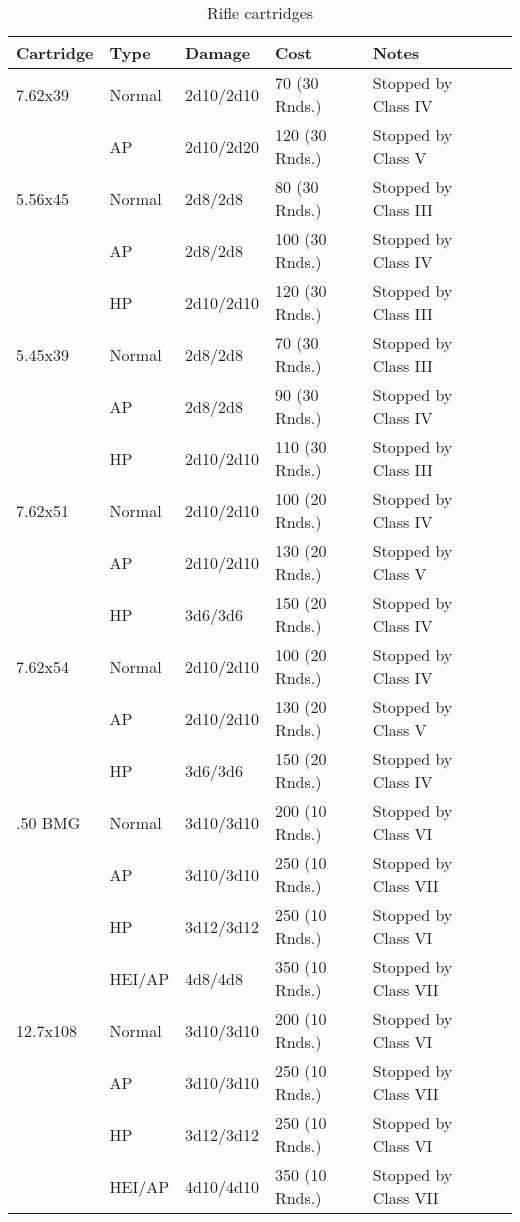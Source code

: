 \begin{table}
  \caption{Rifle cartridges}
  \begin{center}
    \begin{tabular}{| l | l | l | l | l | l |}
      \hline
      \textbf{Cartridge}  & \textbf{Type} & \textbf{Damage} &
      \textbf{Cost}  & \textbf{Notes} \\ \hline

      7.62x39  & Normal  & 2d10/2d10  & 70 (30 Rnds.)  & Stopped by Class IV \\ \hline
      \,       & AP      & 2d10/2d20  & 120 (30 Rnds.) & Stopped by Class V \\ \hline
      5.56x45  & Normal  & 2d8/2d8    & 80 (30 Rnds.)  & Stopped by Class III \\ \hline
      \,       & AP      & 2d8/2d8    & 100 (30 Rnds.) & Stopped by Class IV \\ \hline
      \,       & HP      & 2d10/2d10  & 120 (30 Rnds.) & Stopped by Class III \\ \hline
      5.45x39  & Normal  & 2d8/2d8    & 70 (30 Rnds.)  & Stopped by Class III \\ \hline
      \,       & AP      & 2d8/2d8    & 90 (30 Rnds.)  & Stopped by Class IV \\ \hline
      \,       & HP      & 2d10/2d10  & 110 (30 Rnds.) & Stopped by Class III \\ \hline
      7.62x51  & Normal  & 2d10/2d10  & 100 (20 Rnds.) & Stopped by Class IV \\ \hline
      \,       & AP      & 2d10/2d10  & 130 (20 Rnds.) & Stopped by Class V \\ \hline
      \,       & HP      & 3d6/3d6    & 150 (20 Rnds.) & Stopped by Class IV \\ \hline
      7.62x54  & Normal  & 2d10/2d10  & 100 (20 Rnds.) & Stopped by Class IV \\ \hline
      \,       & AP      & 2d10/2d10  & 130 (20 Rnds.) & Stopped by Class V \\ \hline
      \,       & HP      & 3d6/3d6    & 150 (20 Rnds.) & Stopped by Class IV \\ \hline
      .50 BMG  & Normal  & 3d10/3d10  & 200 (10 Rnds.) & Stopped by Class VI \\ \hline
      \,       & AP      & 3d10/3d10  & 250 (10 Rnds.) & Stopped by Class VII \\ \hline
      \,       & HP      & 3d12/3d12  & 250 (10 Rnds.) & Stopped by Class VI \\ \hline
      \,       & HEI/AP  & 4d8/4d8    & 350 (10 Rnds.) & Stopped by Class VII \\ \hline
      12.7x108 & Normal  & 3d10/3d10  & 200 (10 Rnds.) & Stopped by Class VI \\ \hline
      \,       & AP      & 3d10/3d10  & 250 (10 Rnds.) & Stopped by Class VII \\ \hline
      \,       & HP      & 3d12/3d12  & 250 (10 Rnds.) & Stopped by Class VI \\ \hline
      \,       & HEI/AP  & 4d10/4d10  & 350 (10 Rnds.) & Stopped by Class VII \\ \hline


\end{tabular}
\end{center}
\end{table}
